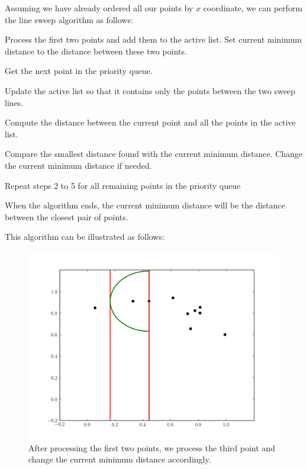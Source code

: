 Assuming we have already ordered all our points by $x$ coordinate, we can perform the line sweep algorithm as follows:

\vspace{5mm}
\begin{compactenum}[1.]
\item 
Process the first two points and add them to the active list.
Set current minimum distance to the distance between these two points.
\item 
Get the next point in the priority queue.
\item 
Update the active list so that it contains only the points between the two sweep lines.
\item 
Compute the distance between the current point and all the points in the active list.
\item 
Compare the smallest distance found with the current minimum distance. 
Change the current minimum distance if needed.
\item 
Repeat steps 2 to 5 for all remaining points in the priority queue
\end{compactenum}
\vspace{5mm}

When the algorithm ends, the current minimum distance will be the distance between the closest pair of points.

This algorithm can be illustrated as follows:
\begin{figure}[H]
\includegraphics[width = \textwidth]{simple0.pdf}
\caption{After processing the first two points, we process the third point and change the current minimum distance accordingly.}
\end{figure}


